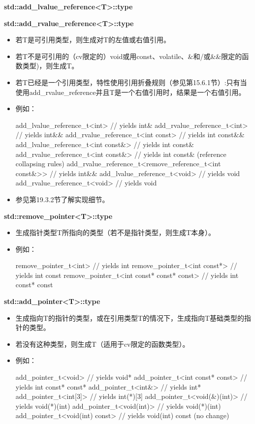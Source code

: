 \textbf{std::add\_lvalue\_reference<T>::type}

\textbf{std::add\_rvalue\_reference<T>::type}

\begin{itemize}
\item
若T是可引用类型，则生成对T的左值或右值引用。

\item
若T不是可引用的（cv限定的）void或用const、volatile、\&和/或\&\&限定的函数类型)，则生成T。

\item
若T已经是一个引用类型，特性使用引用折叠规则（参见第15.6.1节）:只有当使用add\_rvalue\_reference并且T是一个右值引用时，结果是一个右值引用。

\item
例如：
\begin{cpp}
add_lvalue_reference_t<int> // yields int&
add_rvalue_reference_t<int> // yields int&&
add_rvalue_reference_t<int const> // yields int const&&
add_lvalue_reference_t<int const&> // yields int const&
add_rvalue_reference_t<int const&> // yields int const& (reference collapsing rules)
add_rvalue_reference_t<remove_reference_t<int const&>> // yields int&&
add_lvalue_reference_t<void> // yields void
add_rvalue_reference_t<void> // yields void
\end{cpp}

\item
参见第19.3.2节了解实现细节。
\end{itemize}

\textbf{std::remove\_pointer<T>::type}

\begin{itemize}
\item
生成指针类型T所指向的类型（若不是指针类型，则生成T本身）。

\item
例如：
\begin{cpp}
remove_pointer_t<int> // yields int
remove_pointer_t<int const*> // yields int const
remove_pointer_t<int const* const* const> // yields int const* const
\end{cpp}
\end{itemize}

\textbf{std::add\_pointer<T>::type}

\begin{itemize}
\item
生成指向T的指针的类型，或在引用类型T的情况下，生成指向T基础类型的指针的类型。

\item
若没有这种类型，则生成T（适用于cv限定的函数类型）。

\item
例如：
\begin{cpp}
add_pointer_t<void> // yields void*
add_pointer_t<int const* const> // yields int const* const*
add_pointer_t<int&> // yields int*
add_pointer_t<int[3]> // yields int(*)[3]
add_pointer_t<void(&)(int)> // yields void(*)(int)
add_pointer_t<void(int)> // yields void(*)(int)
add_pointer_t<void(int) const> // yields void(int) const (no change)
\end{cpp}
\end{itemize}

